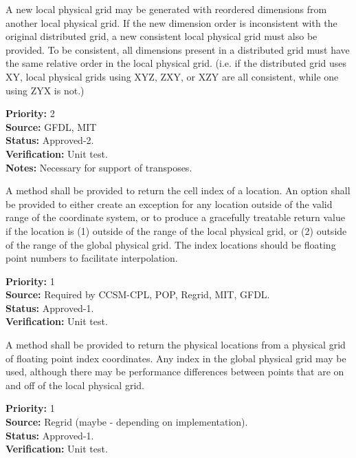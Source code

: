 A new local physical grid may be generated with reordered dimensions from another local physical grid.
If the new dimension order is inconsistent with the original distributed grid, a new
consistent local physical grid must also be provided.  To be consistent, all dimensions present
in a distributed grid must have the same relative order in the local physical grid.  (i.e. if the
distributed grid uses XY, local physical grids using XYZ, ZXY, or XZY are all consistent, while one using
ZYX is not.)
\begin{reqlist}
{\bf Priority:} 2\\
{\bf Source:} GFDL, MIT\\
{\bf Status:} Approved-2. \\
{\bf Verification:} Unit test.\\
{\bf Notes:} Necessary for support of transposes.
\end{reqlist}

A method shall be provided to return the cell index of a location.  An option shall
be provided to either create an exception for any location outside of the valid
range of the coordinate system, or to produce a gracefully treatable return value if
the location is (1) outside of the range of the local physical grid, or (2) outside of the
range of the global physical grid.  The index locations should be floating point numbers to
facilitate interpolation.
\begin{reqlist}
{\bf Priority:} 1\\
{\bf Source:} Required by CCSM-CPL, POP, Regrid, MIT, GFDL. \\
{\bf Status:} Approved-1. \\
{\bf Verification:} Unit test.
\end{reqlist}

A method shall be provided to return the physical locations from a physical grid of
floating point index coordinates.  Any index in the global physical grid may be
used, although there may be performance differences between points that are on
and off of the local physical grid.
\begin{reqlist}
{\bf Priority:} 1\\
{\bf Source:} Regrid (maybe - depending on implementation). \\
{\bf Status:} Approved-1. \\
{\bf Verification:} Unit test.
\end{reqlist}

